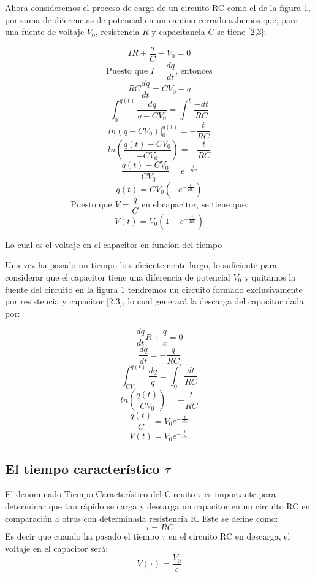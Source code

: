 \documentclass[10pt,letter]{article}
\begin{document}
\begin{multicols}{2}
Ahora consideremos el proceso de carga de un circuito RC como el de la figura 1, por suma de diferencias de potencial en un camino cerrado sabemos que, para una fuente de voltaje $V_0$, resistencia $R$ y capacitancia $C$ se tiene [2,3]: 

$$IR+\dfrac{q}{C}-V_0=0$$
$$\text{Puesto que } I=\dfrac{dq}{dt} \text{, entonces}$$
$$RC\dfrac{dq}{dt}=CV_0-q$$
$$\int_0^{q(t)}\dfrac{dq}{q-CV_0}=\int_0^t\dfrac{-dt}{RC}$$
$$ln(q-CV_0)|_0^{q(t)}=-\dfrac{t}{RC}$$
$$ln\left(\dfrac{q(t)-CV_0}{-CV_0}\right)=-\dfrac{t}{RC}$$
$$\dfrac{q(t)-CV_0}{-CV_0}=e^{-\frac{t}{RC}}$$
$$q(t)=CV_0\left(-e^{-\frac{t}{RC}}\right)$$
$$\text{Puesto que } V=\dfrac{q}{C} \text{ en el capacitor, se tiene que:}$$ 
\begin{equation}
V(t)=V_0\left(1-e^{-\frac{t}{RC}}\right)
\end{equation}

Lo cual es el voltaje en el capacitor en funcion del tiempo

\vspace{0.3cm}

Una vez ha pasado un tiempo lo suficientemente largo, lo suficiente para considerar que el capacitor tiene una diferencia de potencial $V_0$ y quitamos la fuente del circuito en la figura 1 tendremos un circuito formado exclusivamente por resistencia y capacitor [2,3], lo cual generará la descarga del capacitor dada por:

$$\dfrac{dq}{dt}R+\dfrac{q}{c}=0$$
$$\dfrac{dq}{dt}=-\dfrac{q}{RC}$$
$$\int_{CV_0}^{q(t)}\dfrac{dq}{q}=\int_0^t\dfrac{dt}{RC}$$
$$ln\left(\dfrac{q(t)}{CV_0}\right)=-\dfrac{t}{RC}$$ 
$$\dfrac{q(t)}{C}=V_0e^{-\frac{t}{RC}}$$
\begin{equation}
V(t)=V_0e^{-\frac{t}{RC}}
\end{equation}
\subsection{El tiempo característico $\tau$ }
El denominado Tiempo Característico del Circuito $\tau$ es importante para determinar que tan rápido se carga y descarga un capacitor en un circuito RC en comparación a otros con determinada resistencia R. Este se define como:
\begin{equation}
\tau=RC
\end{equation}
Es decir que cuando ha pasado el tiempo $\tau$ en el circuito RC en descarga, el voltaje en el capacitor será:
\begin{equation}
V(\tau)=\dfrac{V_0}{e}
\end{equation}

\end{multicols}
\end{document}
